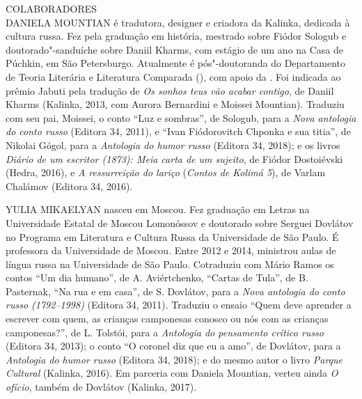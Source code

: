 \clearpage
\thispagestyle{empty}

\movetoevenpage
\small\MyriadPro
\label{colaboradores}

\noindent{}COLABORADORES\\

\noindent{}DANIELA MOUNTIAN é tradutora, designer e criadora da Kalinka, de­dicada
à cultura russa. Fez pela  graduação em história, mestrado sobre
Fiódor Sologub e doutorado"-sanduíche sobre Daniil Kharms, com estágio de
um ano na Casa de Púchkin, em São Petersburgo. Atualmente é
pós"-doutoranda do Departamento de Teoria Literária e Literatura
Comparada (), com apoio da . Foi indicada ao prêmio Jabuti pela
tradução de \emph{Os sonhos teus vão acabar contigo}, de Daniil Kharms
(Kalinka, 2013, com Aurora Bernardini e Mois­sei Mountian). Traduziu com
seu pai, Moissei, o conto ``Luz e sombras'', de Sologub, para a
\emph{Nova antologia do conto russo} (Editora 34, 2011), e ``Ivan
Fiódorovitch Chponka e sua titia'', de Nikolai Gógol, para a
\emph{Antologia do humor russo} (Editora 34, 2018); e os livros
\emph{Diário de um escritor (1873): Meia carta de um sujeito}, de Fiódor
Dostoiévski (Hedra, 2016), e \emph{A ressurreição do lariço}
(\emph{Contos de Kolimá 5}), de Varlam Chalámov (Editora 34, 2016).


\medskip

\noindent{}YULIA MIKAELYAN nasceu em Moscou. Fez graduação em Letras na
Universidade Estatal de Moscou Lomonóssov e doutorado sobre Serguei
Dovlátov no Programa em Literatura e Cultura Russa da Universidade de
São Paulo. É professora da Universidade  de Moscou. Entre 2012 e
2014, ministrou aulas de língua russa na Universidade de São Paulo.
Cotraduziu com Mário Ramos os contos ``Um dia humano'', de A.
Aviértchenko, ``Cartas de Tula'', de B. Pasternak, ``Na rua e em casa'',
de S. Dovlátov, para a \emph{Nova antologia do conto russo (1792--1998)}
(Editora 34, 2011). Traduziu o ensaio ``Quem deve aprender a escrever
com quem, as crianças camponesas conosco ou nós com as crianças
campone­sas?'', de L. Tolstói, para a \emph{Antologia do pensamento
crítico russo} (Editora 34, 2013); o conto ``O coronel diz que eu a
amo'', de Dovlátov, para a \emph{Antologia do humor russo} (Editora 34,
2018); e do mesmo autor o livro \emph{Parque Cultural} (Kalinka, 2016).
Em parceria com Daniela Mountian, verteu ainda \emph{O ofício}, também
de Dovlátov (Kalinka, 2017).

\medskip

